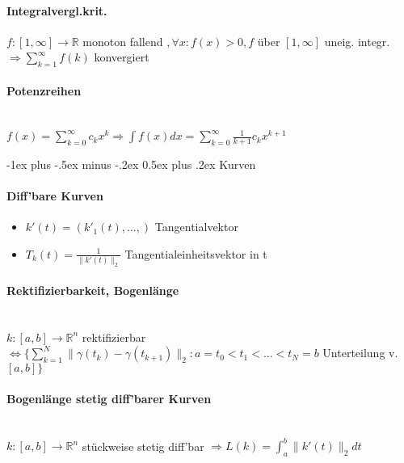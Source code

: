 \documentclass[paper=a3,paper=landscape, fontsize=9pt,DIV=25]{scrartcl}
\makeatletter
\newcommand{\real}{{\mathbb{R}}}
\renewcommand{\section}{\@startsection{section}{1}{0mm}%
  {-1ex plus -.5ex minus -.2ex}%
  {0.5ex plus .2ex}%
  {\color{blue}\normalfont\large\bfseries}}
\makeatother
\begin{document}
\begin{multicols*}{4}
  \paragraph{Integralvergl.krit.}
  $f:[1,\infty]\rightarrow\real$ monoton fallend $, \forall x: f(x)>0, f$ über $[1,\infty]$ uneig. integr. $\Rightarrow \sum_{k=1}^{\infty}f(k)$ konvergiert


  \paragraph{Potenzreihen}\hspace{0pt} \\
  $f(x)=\sum_{k=0}^{\infty}c_kx^k \Rightarrow \int f(x)dx=\sum_{k=0}^{\infty}\frac{1}{k+1}c_kx^{k+1}$



  \section{Kurven}

  \paragraph{Diff'bare Kurven}
  \begin{itemize}
  \item $k'(t)=(k'_1(t),...,)$ Tangentialvektor
  \item $T_k(t)=\frac{1}{\lVert k'(t)\rVert_2}$ Tangentialeinheitsvektor in t
  \end{itemize}


  \paragraph{Rektifizierbarkeit, Bogenlänge}\hspace{0pt} \\
  $k:[a,b]\rightarrow \real^n$ rektifizierbar $\Leftrightarrow \{\sum_{k=1}^{N}\lVert\gamma(t_k)-\gamma(t_{k+1})\rVert_2: a = t_0 < t_1 < ... < t_N = b$ Unterteilung v. $[a,b]\}$


  \paragraph{Bogenlänge stetig diff'barer Kurven}\hspace{0pt} \\
  $k: [a,b]\rightarrow \real^n$ stückweise stetig diff'bar $\Rightarrow L(k)=\int_{a}^{b}\lVert k'(t)\rVert_2 dt$


\end{multicols*}
\end{document}
